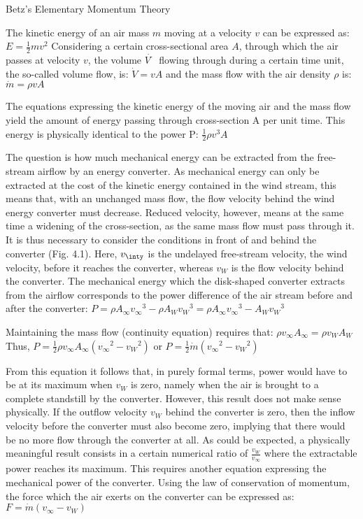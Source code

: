 Betz’s Elementary Momentum Theory

The kinetic energy of an air mass $m$ moving at a velocity $v$ can be expressed as:
$E = \frac{1}{2}mv^2$
Considering a certain cross-sectional area $A$, through which the air passes at velocity $v$, the volume $\dot{V̇}$ flowing through during a certain time unit, the so-called volume flow, is:
$\dot{V} = vA$
and the mass flow with the air density $\rho$ is:
$\dot{m} = \rho v A $

The equations expressing the kinetic energy of the moving air and the mass flow yield the amount of energy passing through cross-section A per unit time. This energy is physically identical to the power P:
$\frac{1}{2}\rho {v}^3 A $

The question is how much mechanical energy can be extracted from the free-stream airflow by an energy converter. As mechanical energy can only be extracted at the cost of the kinetic energy contained in the wind stream, this means that, with an unchanged mass flow, the flow velocity behind the wind energy converter must decrease. Reduced velocity, however, means at the same time a widening of the cross-section, as the same mass flow must pass through it. It is thus necessary to consider the conditions in front of and behind the converter (Fig. 4.1).
Here, $v_{\inty}$ is the undelayed free-stream velocity, the wind velocity, before it reaches the converter, whereas $v_{W}$ is the flow velocity behind the converter. The mechanical energy which the disk-shaped converter extracts from the airflow corresponds to the power difference of the air stream before and after the converter:
$P = \rho A_{\infty} {v_{\infty}}^3 − \rho A_W {v_W}^3 = \rho A_{\infty} {v_{\infty}}^3 − A_W {v_W}^3$

Maintaining the mass flow (continuity equation) requires that:
$\rho v_{\infty} A_{\infty} = \rho v_{W} A_{W}$
Thus,
$P = \frac{1}{2}\rho v_{\infty}A_{\infty}({v_{\infty}}^2-{v_W}^2)$
or
$P = \frac{1}{2}\dot{m}({v_{\infty}}^2-{v_W}^2)$

From this equation it follows that, in purely formal terms, power would have to be at its maximum when $v_W$ is zero, namely when the air is brought to a complete standstill by the converter. However, this result does not make sense physically. If the outflow velocity $v_W$ behind the converter is zero, then the inflow velocity before the converter must also become zero, implying that there would be no more flow through the converter at all. As could be expected, a physically meaningful result consists in a certain numerical ratio of $\frac{v_{W}}{v_{\infty}}$ where the extractable power reaches its maximum.
This requires another equation expressing the mechanical power of the converter. Using the law of conservation of momentum, the force which the air exerts on the converter can be expressed as:
$F = \dot{m}(v_{\infty} - v_W)$

